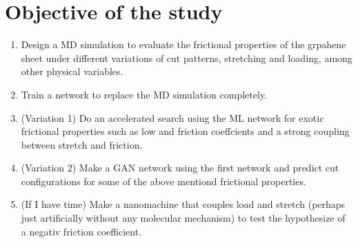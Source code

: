 


%
\section{Objective of the study}

\begin{enumerate}
    \item Design a MD simulation to evaluate the frictional properties of the grpahene sheet under different variations of cut patterns, stretching and loading, among other physical variables.
    \item Train a network to replace the MD simulation completely.
    \item (Variation 1) Do an accelerated search using the ML network for exotic frictional properties such as low and friction coeffcients and a strong coupling between stretch and friction. 
    \item (Variation 2) Make a GAN network using the first network and predict cut configurations for some of the above mentiond frictional properties.
    \item (If I have time) Make a nanomachine that couples load and stretch (perhaps just artificially without any molecular mechanism) to test the hypothesize of a negativ friction coefficient. 
\end{enumerate}


